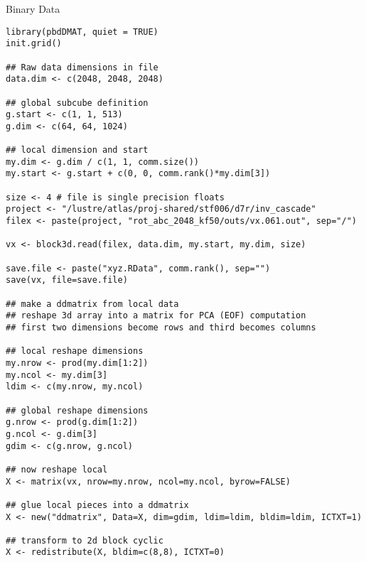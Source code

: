 \begin{frame}
  \begin{exampleblock}{Binary Data}\pause
    \begin{lstlisting}[title=3d Block Binary Reader]
library(pbdDMAT, quiet = TRUE)
init.grid()

## Raw data dimensions in file
data.dim <- c(2048, 2048, 2048)

## global subcube definition
g.start <- c(1, 1, 513)
g.dim <- c(64, 64, 1024)

## local dimension and start
my.dim <- g.dim / c(1, 1, comm.size())
my.start <- g.start + c(0, 0, comm.rank()*my.dim[3])

size <- 4 # file is single precision floats
project <- "/lustre/atlas/proj-shared/stf006/d7r/inv_cascade"
filex <- paste(project, "rot_abc_2048_kf50/outs/vx.061.out", sep="/")

vx <- block3d.read(filex, data.dim, my.start, my.dim, size)

save.file <- paste("xyz.RData", comm.rank(), sep="")
save(vx, file=save.file)

## make a ddmatrix from local data
## reshape 3d array into a matrix for PCA (EOF) computation
## first two dimensions become rows and third becomes columns

## local reshape dimensions
my.nrow <- prod(my.dim[1:2])
my.ncol <- my.dim[3]
ldim <- c(my.nrow, my.ncol)

## global reshape dimensions
g.nrow <- prod(g.dim[1:2])
g.ncol <- g.dim[3]
gdim <- c(g.nrow, g.ncol)

## now reshape local
X <- matrix(vx, nrow=my.nrow, ncol=my.ncol, byrow=FALSE)

## glue local pieces into a ddmatrix
X <- new("ddmatrix", Data=X, dim=gdim, ldim=ldim, bldim=ldim, ICTXT=1)

## transform to 2d block cyclic
X <- redistribute(X, bldim=c(8,8), ICTXT=0)
    \end{lstlisting}
  \end{exampleblock}
\end{frame}

